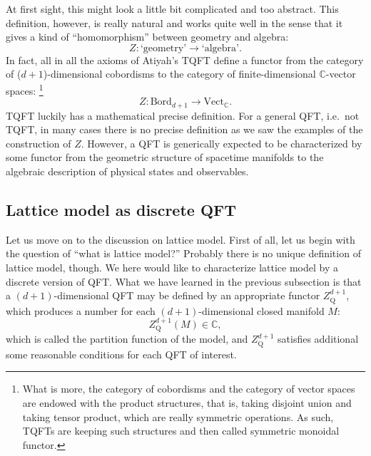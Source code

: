 At first sight, this might look a little bit complicated and too abstract.
This definition, however, is really natural and works quite well in
the sense that it gives a kind of ``homomorphism'' between geometry
and algebra:
\begin{equation*}
  Z : \text{`geometry'} \longrightarrow \text{`algebra'}.
\end{equation*}
In fact, all in all the axioms of Atiyah's TQFT define a functor
from the category of ($d+1$)-dimensional cobordisms to the category
of finite-dimensional $\mathbb{C}$-vector spaces:%
%
\footnote{What is more, the category of cobordisms and the category of vector
spaces are endowed with the product structures, that is, taking disjoint
union and taking tensor product, which are really symmetric operations.
As such, TQFTs are keeping such structures and then
called symmetric monoidal functor. }
%
\begin{equation}
  Z:\mathrm{Bord}_{d+1}  \longrightarrow  \mathrm{Vect}_{\mathbb{C}}.
\end{equation}
TQFT luckily has a mathematical precise definition. For a general
QFT, i.e.~not TQFT, in many cases there is no precise definition as
we saw the examples of the construction of $Z$. However, a QFT is
generically expected to be characterized by some functor from the
geometric structure of spacetime manifolds to the algebraic description
of physical states and observables.







\subsection{Lattice model as discrete QFT}
\label{sec:lattice_model}

Let us move on to the discussion on lattice model. First of all,
let us begin with the question of ``what is lattice model?'' Probably
there is no unique definition of lattice model, though. We here would like
to characterize lattice model by a discrete version of QFT. What we
have learned in the previous subsection is that a $(d+1)$-dimensional
QFT may be defined by an appropriate functor $Z_{\mathrm{Q}}^{d+1}$,
which produces a number for each $(d+1)$-dimensional closed manifold
$M$:
\begin{equation}
  Z_{\mathrm{Q}}^{d+1}(M)  \in  \mathbb{C},
\end{equation}
which is called the partition function of the model, and $Z_{\mathrm{Q}}^{d+1}$
satisfies additional some reasonable conditions for each QFT of interest.

